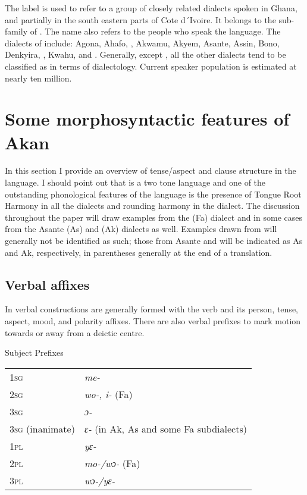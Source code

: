 \documentclass[output=paper]{langsci/langscibook}
\begin{document}
The label  is used to refer to a group of closely related dialects spoken in Ghana, and partially in the south eastern parts of Cote d´Ivoire. It belongs to the  sub-family of . The name also refers to the people who speak the language. The dialects of  include: Agona, Ahafo, , Akwamu, Akyem, Asante, Assin, Bono, Denkyira, , Kwahu, and . Generally, except , all the other dialects tend to be classified as  in terms of  dialectology. Current speaker population is estimated at nearly ten million.

\section{Some morphosyntactic features of Akan}\label{§2:morphosyntactic.osam}

In this section I provide an overview of tense/aspect and clause structure in the language. I should point out that  is a two tone language and one of the outstanding phonological features of the language is the presence of Tongue Root Harmony in all the dialects and rounding harmony in the  dialect. The discussion throughout the paper will draw examples from the  (Fa) dialect and in some cases from the Asante (As) and  (Ak) dialects as well. Examples drawn from  will generally not be identified as such; those from Asante and  will be indicated as As and Ak, respectively, in parentheses generally at the end of a translation.

\subsection{Verbal affixes}\label{§2.1:verbal.osam}

In  verbal constructions are generally formed with the verb and its person, tense, aspect, mood, and polarity affixes. There are also verbal prefixes to mark motion towards or away from a deictic centre.

\ea
\label{ex:1.osam}
Subject Prefixes \\
\begin{table}
\begin{tabular}{ll}
     \textsc{1sg} & \textit{me-}\\
     \textsc{2sg} & \textit{wo-, i-} (Fa)\\
     \textsc{3sg} & \textit{ɔ-}\\
     \textsc{3sg} (inanimate) & \textit{ɛ-} (in Ak, As and some Fa subdialects)\\
     \textsc{1pl} & \textit{yɛ-}\\
     \textsc{2pl} & \textit{mo-/wɔ-} (Fa)\\
     \textsc{3pl} & \textit{wɔ-/yɛ-}\\
\end{tabular}
\end{table}
\z
\end{document}
